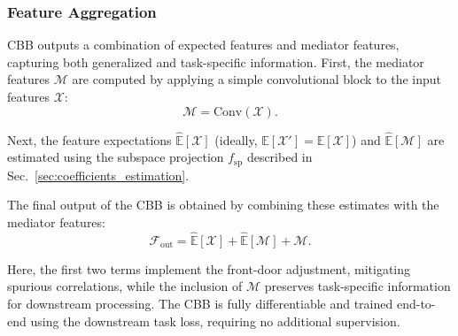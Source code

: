 \subsubsection{Feature Aggregation}
CBB outputs a combination of expected features and mediator features, capturing both generalized and task-specific information.  
First, the mediator features $\mathcal{M}$ are computed by applying a simple convolutional block to the input features $\mathcal{X}$:  
\begin{equation}
   \mathcal{M} = \mathrm{Conv}(\mathcal{X}).
\end{equation}

Next, the feature expectations 
$\hat{\mathbb{E}}[\mathcal{X}]$ (ideally, $\mathbb{E}[\mathcal{X}'] = \mathbb{E}[\mathcal{X}]$) 
and $\hat{\mathbb{E}}[\mathcal{M}]$ are estimated 
using the subspace projection $f_{\mathrm{sp}}$ described in Sec.~\ref{sec:coefficients_estimation}.  

The final output of the CBB is obtained by combining these estimates with the mediator features:
\begin{equation}
   \mathcal{F}_{\text{out}} = \hat{\mathbb{E}}[\mathcal{X}] + \hat{\mathbb{E}}[\mathcal{M}] + \mathcal{M}.
\end{equation}

Here, the first two terms implement the front-door adjustment, mitigating spurious correlations, 
while the inclusion of $\mathcal{M}$ preserves task-specific information for downstream processing. 
The CBB is fully differentiable and trained end-to-end using the downstream task loss, 
requiring no additional supervision.



